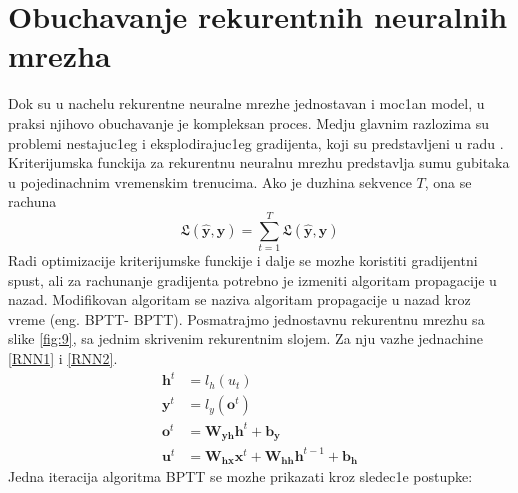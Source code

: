 \documentclass[a4paper, openany, oneside, 11pt]{book}
\begin{document}
\section{Obuchavanje rekurentnih neuralnih mrezha}
Dok su u nachelu rekurentne neuralne mrezhe jednostavan i moc1an model, u praksi njihovo obuchavanje je kompleksan proces. Medju glavnim razlozima su problemi nestajuc1eg i eksplodirajuc1eg gradijenta, koji su predstavljeni u radu \cite{Bengio}. Kriterijumska funckija za rekurentnu neuralnu mrezhu predstavlja sumu gubitaka u pojedinachnim vremenskim trenucima. Ako je duzhina sekvence $T$, ona se rachuna 
\begin{equation}
\mathfrak{L}(\mathbf{\hat{y}},\mathbf{y}) = \sum^{T}_{t=1}\mathfrak{L}(\mathbf{\hat{y}},\mathbf{y})
\end{equation}
Radi optimizacije kriterijumske funckije i dalje se mozhe koristiti gradijentni spust, ali za rachunanje gradijenta potrebno je izmeniti algoritam propagacije u nazad. Modifikovan algoritam se naziva algoritam propagacije u nazad kroz vreme \cite{BPTT} (eng. \acrlong{BPTT}- \acrshort{BPTT}). Posmatrajmo jednostavnu rekurentnu mrezhu sa slike \ref{fig:9}, sa jednim skrivenim rekurentnim slojem. Za nju vazhe jednachine \ref{RNN1} i \ref{RNN2}.
\begin{align}
\mathbf{h}^t &= l_h(u_t)\\
\mathbf{y}^t &= l_y(\mathbf{o}^t)\\
\mathbf{o}^t &= \mathbf{W_{yh}}\mathbf{h}^t+\mathbf{b_y}\\
\mathbf{u}^t &= \mathbf{W_{hx}}\mathbf{x}^t+\mathbf{W_{hh}}\mathbf{h}^{t-1}+\mathbf{b_h} 
\end{align}
Jedna iteracija algoritma \acrshort{BPTT} se mozhe prikazati kroz sledec1e postupke:
\renewcommand{\labelenumii}{\arabic{enumii}.}
\end{document}
